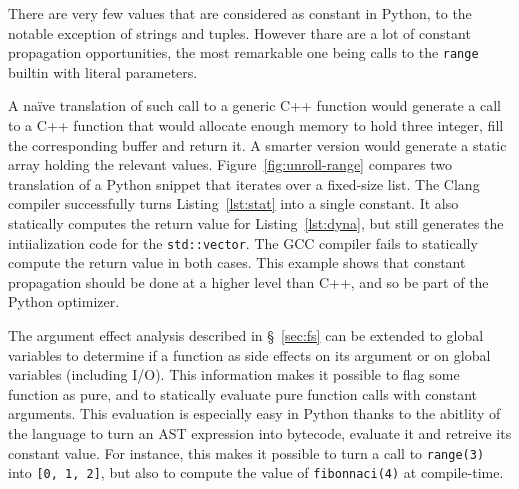 \documentclass[10pt, preprint]{sigplanconf}
\begin{document}
There are very few values that are considered as constant in Python, to the
notable exception of strings and tuples. However thare are a lot of constant
propagation opportunities, the most remarkable one being calls to the
\texttt{range} builtin with literal parameters.

A naïve translation of such call to a generic C++ function would generate a
call to a C++ function that would allocate enough memory to hold three integer,
fill the corresponding buffer and return it. A smarter version would generate a
static array holding the relevant values. Figure~\ref{fig:unroll-range}
compares two translation of a Python snippet that iterates over a fixed-size
list. The Clang compiler successfully turns Listing~\ref{lst:stat} into a
single constant. It also statically computes the return value for
Listing~\ref{lst:dyna}, but still generates the intiialization code for the
\texttt{std::vector}. The GCC compiler fails to statically compute the return
value in both cases. This example shows that constant propagation should be
done at a higher level than C++, and so be part of the Python optimizer.

The argument effect analysis described in \S~\ref{sec:fs} can be extended to
global variables to determine if a function as side effects on its argument or
on global variables (including I/O). This information makes it possible to flag
some function as pure, and to statically evaluate pure function calls with
constant arguments. This evaluation is especially easy in Python thanks to the
abitlity of the language to turn an AST expression into bytecode, evaluate it
and retreive its constant value. For instance, this makes it possible to turn a
call to \texttt{range(3)} into \texttt{[0, 1, 2]}, but also to compute the
value of \texttt{fibonnaci(4)} at compile-time.
\end{document}
